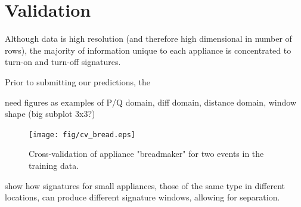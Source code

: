 \documentclass[conference]{IEEEtran}
\begin{document}
%



 

\section{Validation}\label{sec:cv}
Although data is high resolution (and therefore high dimensional in number of rows), the majority of information unique to each appliance is concentrated to turn-on and turn-off signatures.  

Prior to submitting our predictions, the 

need figures as examples of P/Q domain, diff domain, distance domain, window shape (big subplot 3x3?)

\begin{figure}[!t]
	\centering
	\texttt{[image: fig/cv\_bread.eps]}
	\caption{Cross-validation of appliance "breadmaker" for two events in the training data.}
	\label{fig:bread}
\end{figure}

show how signatures for small appliances, those of the same type in different locations, can produce different signature windows, allowing for separation.
\end{document}
